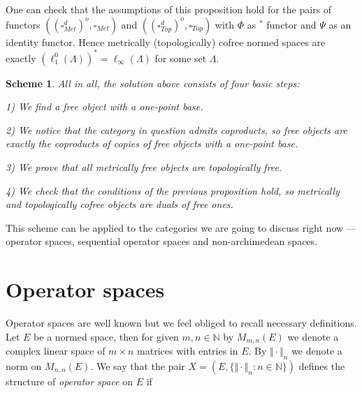 \documentclass[a0b,landscape]{a0poster}
\newtheorem*{scheme}{Scheme}
\begin{document}
\begin{multicols}{4}
One can check that the assumptions of this proposition hold for the pairs of functors $((\square_{Met}^d)^o,\square_{Met})$ and $((\square_{Top}^d)^o,\square_{Top})$ with
$\Phi$ as ${}^*$ functor and $\Psi$ as an identity functor. Hence metrically (topologically) cofree normed spaces are exactly $(\ell_1^0(\Lambda))^*=\ell_\infty(\Lambda)$ 
for some set $\Lambda$.

\begin{scheme}
All in all, the solution above consists of four basic steps:

1) We find a free object with a one-point base.

2) We notice that the category in question admits coproducts, so free objects are exactly the coproducts of copies of free objects with a one-point base.

3) We prove that all metrically free objects are topologically free.

4) We check that the conditions of the previous proposition hold, so metrically and topologically cofree objects are duals of free ones.
\end{scheme}

This scheme can be applied to the categories we are going to discuss right now --- operator spaces, sequential operator spaces and non-archimedean spaces.










\section*{Operator spaces}

Operator spaces are well known but we feel obliged to recall necessary definitions. Let $E$ be a normed space, then for given $m,n\in\mathbb{N}$ by $M_{m,n}(E)$ we denote a complex linear space of $m\times n$ matrices with entries in $E$. By $\Vert\cdot\Vert_n$
we denote a norm on $M_{n,n}(E)$. We say that the pair $X=(E,\{\Vert\cdot\Vert_n:n\in\mathbb{N}\})$ defines the structure of \textit{operator space} on $E$ if 


\end{multicols}
\end{document}
